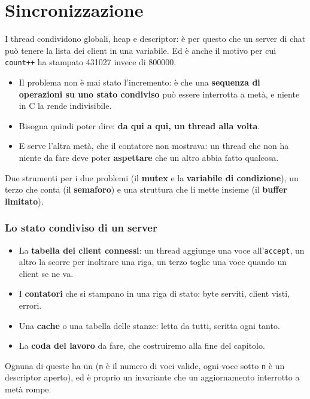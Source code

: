 \chapter{Sincronizzazione}

I thread condividono globali, heap e descriptor: è per questo che un server di chat può tenere la lista dei client in una
variabile. Ed è anche il motivo per cui \texttt{count++} ha stampato 431027 invece di 800000.
\begin{itemize}
    \item Il problema non è mai stato l'incremento: è che una \textbf{sequenza di operazioni su uno stato condiviso} può
          essere interrotta a metà, e niente in C la rende indivisibile.
    \item Bisogna quindi poter dire: \textbf{da qui a qui, un thread alla volta}.
    \item E serve l'altra metà, che il contatore non mostrava: un thread che non ha niente da fare deve poter
          \textbf{aspettare} che un altro abbia fatto qualcosa.
\end{itemize}
Due strumenti per i due problemi (il \textbf{mutex} e la \textbf{variabile di condizione}), un terzo che conta (il
\textbf{semaforo}) e una struttura che li mette insieme (il \textbf{buffer limitato}).

\subsection{Lo stato condiviso di un server}

\begin{itemize}
    \item La \textbf{tabella dei client connessi}: un thread aggiunge una voce all'\texttt{accept}, un altro la scorre per
          inoltrare una riga, un terzo toglie una voce quando un client se ne va.
    \item I \textbf{contatori} che si stampano in una riga di stato: byte serviti, client visti, errori.
    \item Una \textbf{cache} o una tabella delle stanze: letta da tutti, scritta ogni tanto.
    \item La \textbf{coda del lavoro} da fare, che costruiremo alla fine del capitolo.
\end{itemize}
Ognuna di queste ha un  (\texttt{n} è il numero di voci valide, ogni voce sotto \texttt{n} è un
descriptor aperto), ed è proprio un invariante che un aggiornamento interrotto a metà rompe.

